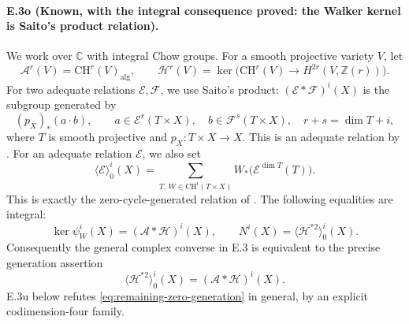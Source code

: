 \paragraph{E.3o (Known, with the integral consequence proved: the Walker
kernel is Saito's product relation).}
We work over $\mathbb C$ with integral Chow groups. For a smooth
projective variety $V$, let
\[
 \mathcal A^r(V)=\mathrm{CH}^r(V)_{\mathrm{alg}},\qquad
 \mathcal H^r(V)=\ker\bigl(\mathrm{CH}^r(V)
                 \longrightarrow H^{2r}(V,\mathbb Z(r))\bigr).
\]
For two adequate relations $\mathcal E,\mathcal F$, we use
Saito's product: $(\mathcal E*\mathcal F)^i(X)$ is the subgroup
generated by
\[
 (p_X)_*(a\cdot b),\qquad
 a\in\mathcal E^r(T\times X),\quad
 b\in\mathcal F^s(T\times X),\quad
 r+s=\dim T+i,
\]
where $T$ is smooth projective and $p_X:T\times X\to X$.
This is an adequate relation by
\citet[Section 1.3 and Lemma 1.3.1, pp.~293--294]{cySaito1992}.
For an adequate relation $\mathcal E$, we also set
\[
 \langle\mathcal E\rangle_0^i(X)
 =\sum_{T,\,W\in\mathrm{CH}^i(T\times X)}
       W_*\bigl(\mathcal E^{\dim T}(T)\bigr).
\]
This is exactly the zero-cycle-generated relation of
\citet[Section 1.7 and Lemma 1.7.1, p.~296]{cySaito1992}.
The following equalities are integral:
\begin{equation}\label{eq:walker-saito-product}
 \ker\psi_W^i(X)=(\mathcal A*\mathcal H)^i(X),
 \qquad
 N^i(X)=\langle\mathcal H^{*2}\rangle_0^i(X).
\end{equation}
Consequently the general complex converse in E.3 is equivalent
to the precise generation assertion
\begin{equation}\label{eq:remaining-zero-generation}
 \boxed{\quad
 \langle\mathcal H^{*2}\rangle_0^i(X)
       =(\mathcal A*\mathcal H)^i(X).
 \quad}
\end{equation}
E.3u below refutes \eqref{eq:remaining-zero-generation}
in general, by an explicit codimension-four family.

